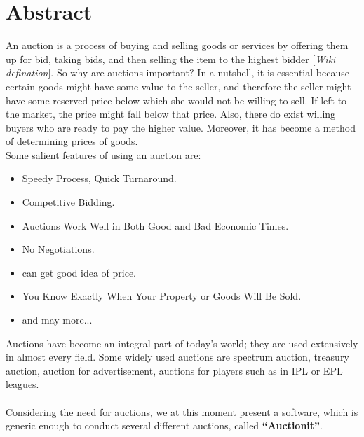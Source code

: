\documentclass[a4paper]{article}
\begin{document}

% 
\section*{Abstract}




An auction is a process of buying and selling goods or services by offering them up for bid, 
taking bids, and then selling the item to the highest bidder [\textit{Wiki defination}]. 
So why are auctions important? In a nutshell, it is essential because certain goods might have some value to the seller,
and therefore the seller might have some reserved price below which she would not be willing to sell.
If left to the market, the price might fall below that price.
Also, there do exist willing buyers who are ready to pay the higher value.
Moreover, it has become a method of determining prices of goods. \\
Some salient features of using an auction are:
\begin{itemize}
    \item Speedy Process, Quick Turnaround.
    \item Competitive Bidding.
    \item Auctions Work Well in Both Good and Bad Economic Times.
    \item No Negotiations.
    \item can get good idea of price.
    \item You Know Exactly When Your Property or Goods Will Be Sold.
    \item and may more...
\end{itemize}
Auctions have become an integral part of today's world; they are used extensively in almost every field. Some widely used auctions are spectrum auction, treasury auction, auction for advertisement, auctions for players such as in IPL or EPL leagues.\\ \\
Considering the need for auctions, we at this moment present a software, which is generic enough to conduct several different auctions, called \textbf{``Auctionit''}.


\pagebreak
\end{document}
